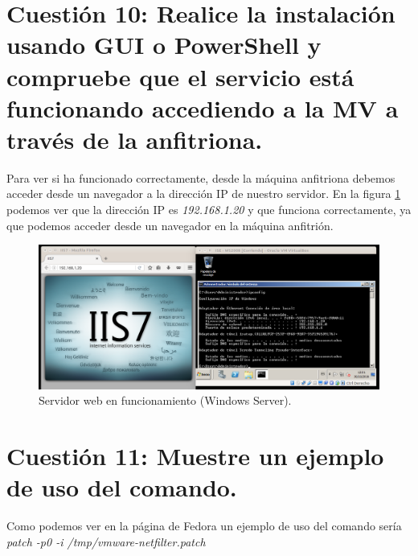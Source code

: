 \documentclass[a4paper,titlepage,12pt]{scrartcl}	%
\numberwithin{figure}{section} %
\numberwithin{table}{section} %
\begin{document}
	\section[Cuestión 10: Realice la instalación usando GUI o PowerShell y compruebe que el servicio está funcionando accediendo a la MV a través de la anfitriona.]{Cuestión 10: Realice la instalación usando GUI o PowerShell y compruebe que el servicio está funcionando accediendo a la MV a través de la anfitriona.}
	
	Para ver si ha funcionado correctamente, desde la máquina anfitriona debemos acceder desde un navegador a la dirección IP de nuestro servidor. En la figura \ref{10-web-windows} podemos ver que la dirección IP es \textit{192.168.1.20} y que funciona correctamente, ya que podemos acceder desde un navegador en la máquina anfitrión.
	
	\begin{figure}[H]
		\includegraphics[width=\linewidth]{./Imagenes/10-web-windows.png}
		\vspace{-0.5cm}
		\caption[Servidor web en funcionamiento (Windows Server).]{Servidor web en funcionamiento (Windows Server).}
		\label{10-web-windows}
	\end{figure}
	
	\section[Cuestión 11: Muestre un ejemplo de uso del comando.]{Cuestión 11: Muestre un ejemplo de uso del comando.}
	
	Como podemos ver en la página de Fedora \cite{patch} un ejemplo de uso del comando sería \textit{patch -p0 -i /tmp/vmware-netfilter.patch} \\
	
\end{document}
